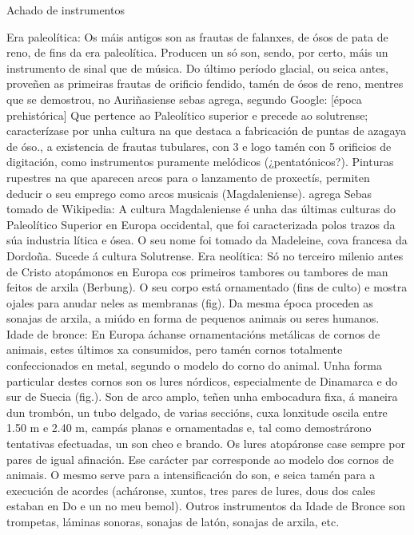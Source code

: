 Achado de instrumentos

Era paleolítica: Os máis antigos son as frautas de falanxes, de ósos de pata de reno, de fins da era paleolítica. Producen un só son, sendo, por certo, máis un instrumento de sinal que de música. Do último período glacial, ou seica antes, proveñen as primeiras frautas de orificio fendido, tamén de ósos de reno, mentres que se demostrou, no Auriñasiense {sebas agrega, segundo Google: [época prehistórica] Que pertence ao Paleolítico superior e precede ao solutrense; caracterízase por unha cultura na que destaca a fabricación de puntas de azagaya de óso.}, a existencia de frautas tubulares, con 3 e logo tamén con 5 orificios de digitación, como instrumentos puramente melódicos (¿pentatónicos?). Pinturas rupestres na que aparecen arcos para o lanzamento de proxectís, permiten deducir o seu emprego como arcos musicais (Magdaleniense). {agrega Sebas tomado de Wikipedia: A cultura Magdaleniense é unha das últimas culturas do Paleolítico Superior en Europa occidental, que foi caracterizada polos trazos da súa industria lítica e ósea. O seu nome foi tomado da Madeleine, cova francesa da Dordoña. Sucede á cultura Solutrense.}
Era neolítica: Só no terceiro milenio antes de Cristo atopámonos en Europa cos primeiros tambores ou tambores de man feitos de arxila (Berbung). O seu corpo está ornamentado (fins de culto) e mostra ojales para anudar neles as membranas (fig). Da mesma época proceden as sonajas de arxila, a miúdo en forma de pequenos animais ou seres humanos.
Idade de bronce: En Europa áchanse ornamentacións metálicas de cornos de animais, estes últimos xa consumidos, pero tamén cornos totalmente confeccionados en metal, segundo o modelo do corno do animal. Unha forma particular destes cornos son os lures nórdicos, especialmente de Dinamarca e do sur de Suecia (fig.). Son de arco amplo, teñen unha embocadura fixa, á maneira dun trombón, un tubo delgado, de varias seccións, cuxa lonxitude oscila entre 1.50 m e 2.40 m, campás planas e ornamentadas e, tal como demostrárono tentativas efectuadas, un son cheo e brando. Os lures atopáronse case sempre por pares de igual afinación. Ese carácter par corresponde ao modelo dos cornos de animais.  O mesmo serve para a intensificación do son, e seica tamén para a execución de acordes (acháronse, xuntos, tres pares de lures, dous dos cales estaban en Do e un no meu bemol). Outros instrumentos da Idade de Bronce son trompetas, láminas sonoras, sonajas de latón, sonajas de arxila, etc.

